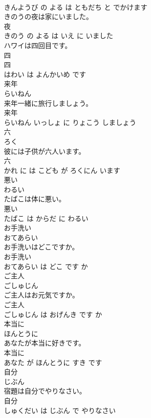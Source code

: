 \documentclass[8pt]{extreport}
\begin{document}
\begin{CJK}{UTF8}{min}
\\	きんようび の よる は ともだち と でかけます			
\\	きのうの夜は家にいました。	
\\	夜 
\\	きのう の よる は いえ に いました			
\\	ハワイは四回目です。	
\\	四 
\\	四 
\\	はわい は よんかいめ です			
\\	来年	
\\	らいねん			
\\	来年一緒に旅行しましょう。	
\\	来年 
\\	らいねん いっしょ に りょこう しましょう			
\\	六	
\\	ろく			
\\	彼には子供が六人います。	
\\	六 
\\	かれ に は こども が ろくにん います			
\\	悪い	
\\	わるい			
\\	たばこは体に悪い。	
\\	悪い 
\\	たばこ は からだ に わるい			
\\	お手洗い	
\\	おてあらい			
\\	お手洗いはどこですか。	
\\	お手洗い 
\\	おてあらい は どこ です か			
\\	ご主人	
\\	ごしゅじん			
\\	ご主人はお元気ですか。	
\\	ご主人 
\\	ごしゅじん は おげんき です か			
\\	本当に	
\\	ほんとうに			
\\	あなたが本当に好きです。	
\\	本当に 
\\	あなた が ほんとうに すき です			
\\	自分	
\\	じぶん			
\\	宿題は自分でやりなさい。	
\\	自分 
\\	しゅくだい は じぶん で やりなさい			

\end{CJK}
\end{document}
